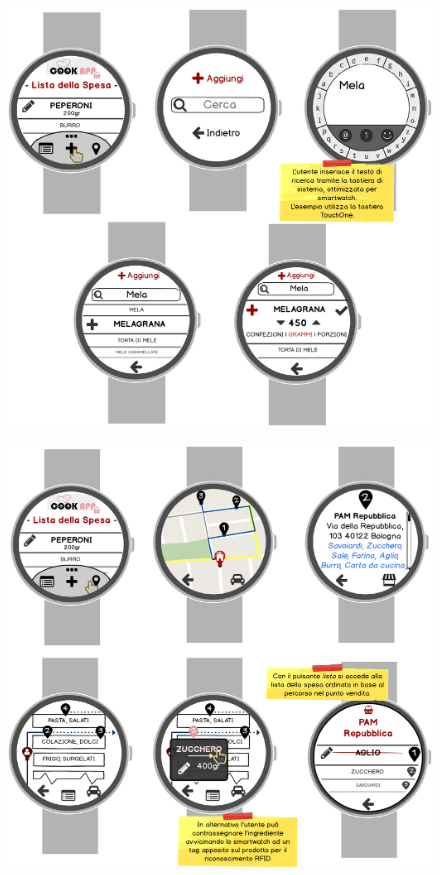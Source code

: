 \begin{figure}[H]
	\centering
	\includegraphics[width=0.95\linewidth]{img/mockup/zmart-add.png}
\end{figure}
\begin{figure}[H]
	\centering
	\includegraphics[width=0.95\linewidth]{img/mockup/zmart-punti-vendita.png}
\end{figure}
